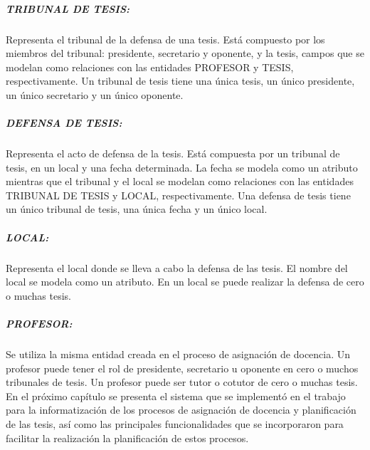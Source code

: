 \subparagraph{TRIBUNAL DE TESIS:}
Representa el tribunal de la defensa de una tesis.
Está compuesto por los miembros del tribunal: presidente, secretario y oponente, 
y la tesis, campos que se modelan como relaciones con las entidades PROFESOR y TESIS, respectivamente.
Un tribunal de tesis tiene una única tesis, un único presidente, un único secretario y 
un único oponente.


\subparagraph{DEFENSA DE TESIS:}
Representa el acto de defensa de la tesis. 
Está compuesta por un tribunal de tesis, en un local y una 
fecha determinada. La fecha se modela como un atributo mientras que 
el tribunal y el local se modelan como relaciones con las entidades TRIBUNAL DE 
TESIS y LOCAL, respectivamente. Una defensa de tesis tiene un único tribunal de tesis,
una única fecha y un único local.



\subparagraph{LOCAL:}
Representa el local donde se lleva a cabo la defensa de las tesis.
El nombre del local se modela como un atributo. 
En un local se puede realizar la defensa de cero o muchas tesis.


\subparagraph{PROFESOR:}
Se utiliza la misma entidad creada en el proceso de asignación de docencia.
Un profesor puede tener el rol de presidente, secretario u oponente en cero o 
muchos tribunales de tesis. Un profesor puede ser 
tutor o cotutor de cero o muchas tesis. \\




En el próximo capítulo se presenta el sistema que se implementó en el 
trabajo para la informatización de los procesos de asignación de docencia
y planificación de las tesis, así como las principales funcionalidades que se 
incorporaron para facilitar la realización la planificación de estos procesos.

